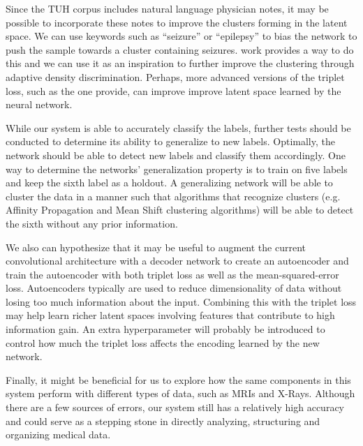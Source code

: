 Since the TUH corpus includes natural language physician notes, it may be possible to incorporate these notes to improve the clusters forming in the latent space. We can use keywords such as ``seizure'' or ``epilepsy'' to bias the network to push the sample towards a cluster containing seizures. \citet{magnetloss} work provides a way to do this and we can use it as an inspiration to further improve the clustering through adaptive density discrimination. Perhaps, more advanced versions of the triplet loss, such as the one \citet{lifted_structure_embedding} provide, can improve improve latent space learned by the neural network. 

While our system is able to accurately classify the labels, further tests should be conducted to determine its ability to generalize to new labels. Optimally, the network should be able to detect new labels and classify them accordingly. One way to determine the networks' generalization property is to train on five labels and keep the sixth label as a holdout. A generalizing network will be able to cluster the data in a manner such that algorithms that recognize clusters (e.g. Affinity Propagation \cite{frey2007clustering} and Mean Shift \cite{comaniciu2002mean} clustering algorithms) will be able to detect the sixth without any prior information.

We also can hypothesize that it may be useful to augment the current convolutional architecture with a decoder network to create an autoencoder and train the autoencoder with both triplet loss as well as the mean-squared-error loss. Autoencoders typically are used to reduce dimensionality of data without losing too much information about the input. Combining this with the triplet loss may help learn richer latent spaces involving features that contribute to high information gain. An extra hyperparameter will probably be introduced to control how much the triplet loss affects the encoding learned by the new network. 

Finally, it might be beneficial for us to explore how the same components in this system perform with different types of data, such as MRIs and X-Rays.  Although there are a few sources of errors, our system still has a relatively high accuracy and could serve as a stepping stone in directly analyzing, structuring and organizing medical data. 